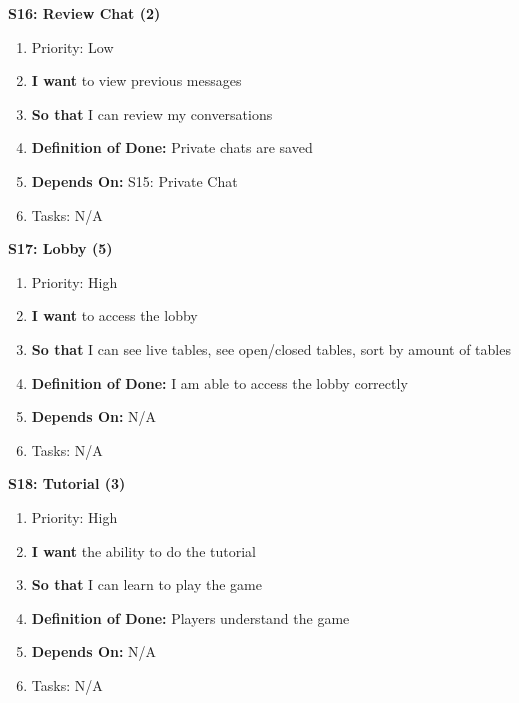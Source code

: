 \textbf{S16: Review Chat (2)}
\begin{enumerate}
    \item Priority: Low
    \item \textbf{I want} to view previous messages
    \item \textbf{So that} I can review my conversations
    \item \textbf{Definition of Done:} Private chats are saved
    \item \textbf{Depends On:} S15: Private Chat
    \item Tasks: N/A
\end{enumerate}


\textbf{S17: Lobby (5)}
\begin{enumerate}
    \item Priority: High
    \item \textbf{I want} to access the lobby 
    \item \textbf{So that} I can see live tables, see open/closed tables, sort by amount of tables
    \item \textbf{Definition of Done:} I am able to access the lobby correctly
    \item \textbf{Depends On:} N/A
    \item Tasks: N/A
\end{enumerate}


\textbf{S18: Tutorial (3)}
\begin{enumerate}
    \item Priority: High
    \item \textbf{I want} the ability to do the tutorial 
    \item \textbf{So that} I can learn to play the game
    \item \textbf{Definition of Done:} Players understand the game
    \item \textbf{Depends On:} N/A
    \item Tasks: N/A
\end{enumerate}


